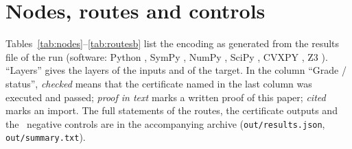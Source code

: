 \onecolumngrid
\section{Nodes, routes and controls}
\label{app:catalogue}

Tables~\ref{tab:nodes}--\ref{tab:routesb} list the encoding as generated from the results file of the run (software: Python \verPython, SymPy \verSympy, NumPy \verNumpy, SciPy \verScipy, CVXPY \verCvxpy, Z3 \verZthree). ``Layers'' gives the layers of the inputs and of the target. In the column ``Grade / status'', \emph{checked} means that the certificate named in the last column was executed and passed; \emph{proof in text} marks a written proof of this paper; \emph{cited} marks an import. The full statements of the routes, the certificate outputs and the \nControls\ negative controls are in the accompanying archive (\texttt{out/results.json}, \texttt{out/summary.txt}).

{\small}

\bigskip
{}
{\small}

\clearpage
{}
{\small}

\twocolumngrid
